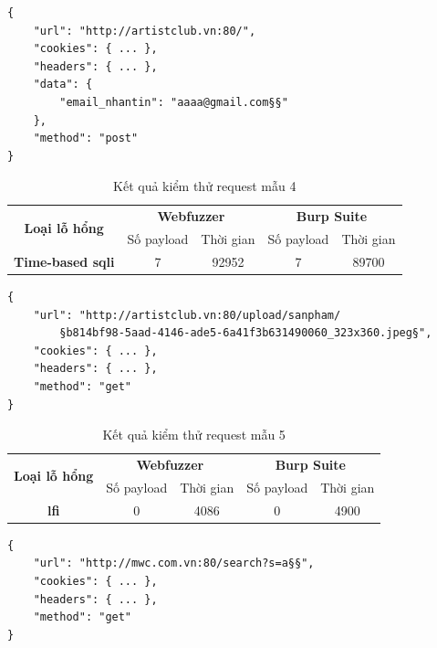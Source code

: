 \FloatBarrier
\begin{lstlisting}[style=ES6, label={lst:base-request-4}, caption={Request mẫu 4 có lỗ hổng time-based \acrshort{sqli}}]
{
    "url": "http://artistclub.vn:80/",
    "cookies": { ... },
    "headers": { ... },
    "data": {
        "email_nhantin": "aaaa@gmail.com§§"
    },
    "method": "post"
}
\end{lstlisting}
\FloatBarrier
\begin{table}[ht]
    \centering
    \caption{Kết quả kiểm thử request mẫu 4}
    \label{tab:testing-result-4}
    \begin{tabular}[ht]{ccccc}
        \toprule[1pt]\midrule[0.3pt]
            \multirow{2}{*}{\textbf{Loại lỗ hổng}}&\multicolumn{2}{c}{\textbf{Webfuzzer}}&\multicolumn{2}{c}{\textbf{Burp Suite}}\\
            \cmidrule(lr){2-3}\cmidrule(lr){4-5}{}&Số payload&Thời gian&Số payload&Thời gian\\
        \midrule[0.3pt]
            \textbf{Time-based \acrshort{sqli}}&7&92952&7&89700\\
        \midrule[0.3pt]\bottomrule[1pt]
    \end{tabular}
\end{table}
\FloatBarrier
\begin{lstlisting}[style=ES6, label={lst:base-request-5}, caption={Request mẫu 5}]
{
    "url": "http://artistclub.vn:80/upload/sanpham/
        §b814bf98-5aad-4146-ade5-6a41f3b631490060_323x360.jpeg§",
    "cookies": { ... },
    "headers": { ... },
    "method": "get"
}
\end{lstlisting}
\FloatBarrier
\begin{table}[ht]
    \centering
    \caption{Kết quả kiểm thử request mẫu 5}
    \label{tab:testing-result-5}
    \begin{tabular}[ht]{ccccc}
        \toprule[1pt]\midrule[0.3pt]
            \multirow{2}{*}{\textbf{Loại lỗ hổng}}&\multicolumn{2}{c}{\textbf{Webfuzzer}}&\multicolumn{2}{c}{\textbf{Burp Suite}}\\
            \cmidrule(lr){2-3}\cmidrule(lr){4-5}{}&Số payload&Thời gian&Số payload&Thời gian\\
        \midrule[0.3pt]
            \textbf{\acrshort{lfi}}&0&4086&0&4900\\
        \midrule[0.3pt]\bottomrule[1pt]
    \end{tabular}
\end{table}
\FloatBarrier
\begin{lstlisting}[style=ES6, label={lst:base-request-6}, caption={Request mẫu 6}]
{
    "url": "http://mwc.com.vn:80/search?s=a§§",
    "cookies": { ... },
    "headers": { ... },
    "method": "get"
}
\end{lstlisting}
